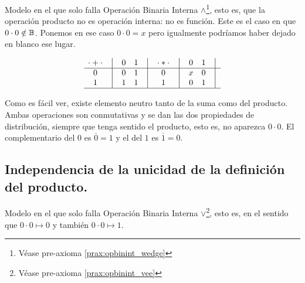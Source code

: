 	Modelo en el que solo falla Operación Binaria Interna $\wedge$\footnote{Véase pre-axioma \ref{prax:opbinint_wedge}}, esto es, que la operación
producto no es operación interna: no es función. Este es el caso en que
\( 0 \cdot 0 \notin \mathbb{B} \). Ponemos en ese caso \(0 \cdot 0 = x\) pero
igualmente podríamos haber dejado en blanco ese lugar.



\[
    \begin{matrix}
        {\cdot + \cdot} & \big{\vert} & {0} & {1} & \big{\vert} \\
        \hline
        {0}             & \big{\vert} & {0} & {1} & \big{\vert} \\
        {1}             & \big{\vert} & {1} & {1} & \big{\vert} \\
        \hline
    \end{matrix}
    \quad
    \begin{matrix}
        {\cdot * \cdot} & \big{\vert} & {0} & {1} & \big{\vert} \\
        \hline
        {0}                   & \big{\vert} & {x} & {0} & \big{\vert} \\
        {1}                   & \big{\vert} & {0} & {1} & \big{\vert} \\
        \hline
    \end{matrix}
\]



	Como es fácil ver, existe elemento neutro tanto de la suma como del
producto. Ambas operaciones son conmutativas y se dan las dos propiedades de
distribución, siempre que tenga sentido el producto, esto es, no aparezca \(0 \cdot 0\). El complementario del \(0\) es \(\overline 0 = 1\) y el del
\(1\) es \(\overline 1 = 0\).



\subsection{Independencia de la unicidad de la definición del producto.}



Modelo en el que solo falla Operación Binaria Interna $\vee$\footnote{Véase pre-axioma \ref{prax:opbinint_vee}}, esto es, en el sentido que \(0
\cdot 0 \mapsto 0\) y también \(0 \cdot 0 \mapsto 1\).



